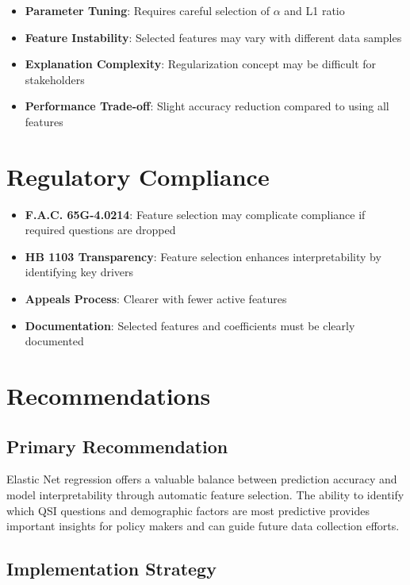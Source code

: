 \begin{itemize}
    \item \textbf{Parameter Tuning}: Requires careful selection of $\alpha$ and L1 ratio
    \item \textbf{Feature Instability}: Selected features may vary with different data samples
    \item \textbf{Explanation Complexity}: Regularization concept may be difficult for stakeholders
    \item \textbf{Performance Trade-off}: Slight accuracy reduction compared to using all features
\end{itemize}

\section{Regulatory Compliance}

\begin{itemize}
    \item \textbf{F.A.C. 65G-4.0214}: Feature selection may complicate compliance if required questions are dropped
    \item \textbf{HB 1103 Transparency}: Feature selection enhances interpretability by identifying key drivers
    \item \textbf{Appeals Process}: Clearer with fewer active features
    \item \textbf{Documentation}: Selected features and coefficients must be clearly documented
\end{itemize}

\section{Recommendations}

\subsection{Primary Recommendation}

Elastic Net regression offers a valuable balance between prediction accuracy and model interpretability through automatic feature selection. The ability to identify which QSI questions and demographic factors are most predictive provides important insights for policy makers and can guide future data collection efforts.

\subsection{Implementation Strategy}

